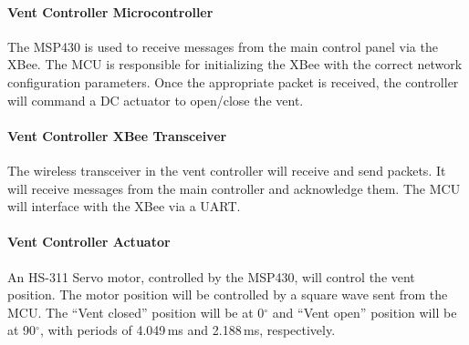 \paragraph{Vent Controller Microcontroller}
The MSP430 is used to receive messages from the main control panel via the XBee.  The MCU is responsible for initializing the XBee with the correct network configuration parameters.  Once the appropriate packet is received, the controller will command a DC actuator to open/close the vent.
\paragraph{Vent Controller XBee Transceiver}
The wireless transceiver in the vent controller will receive and send packets. It will receive messages from the main controller and acknowledge them.  The MCU will interface with the XBee via a UART.
\paragraph{Vent Controller Actuator}
An  HS-311 Servo motor, controlled by the MSP430, will control the vent position. The motor position will be controlled by a square wave sent from the MCU.
The ``Vent closed'' position will be at 0$^{\circ}$ and ``Vent open'' position will be at 90$^{\circ}$, with periods of 4.049\,ms and 2.188\,ms, respectively. 
